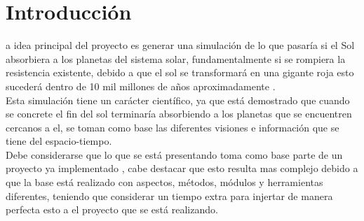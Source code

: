 \documentclass[12pt,journal,compsoc]{IEEEtran}
\begin{document}
\maketitle


\IEEEdisplaynontitleabstractindextext


%
\IEEEpeerreviewmaketitle



\section{Introducción}
a idea principal del proyecto es generar una simulación de lo que pasaría si el Sol absorbiera a los planetas del sistema solar, fundamentalmente si se rompiera la resistencia existente, debido a que el sol se transformará en una gigante roja esto sucederá dentro de 10 mil millones de años aproximadamente \cite{Baker2015}. \\
Esta simulación tiene un carácter científico, ya que está demostrado que cuando se concrete el fin del sol terminaría absorbiendo a los planetas que se encuentren cercanos a el, se toman como base las diferentes visiones e información que se tiene del espacio-tiempo.\\
Debe considerarse que lo que se está presentando toma como base parte de un proyecto ya implementado \cite{anterior}, cabe destacar que esto resulta mas complejo debido a que la base está realizado con aspectos, métodos, módulos y herramientas diferentes, teniendo que considerar un tiempo extra para injertar de manera perfecta esto a el proyecto que se está realizando.
\end{document}
